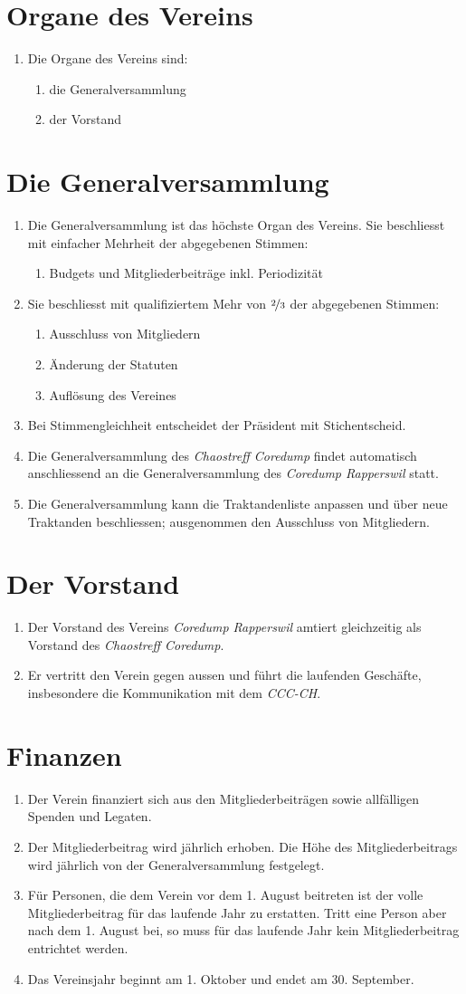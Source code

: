 \documentclass[10pt,a4paper,parskip,fleqn]{scrartcl}
\newcommand{\ol}{\begin{enumerate}[itemsep=-0.2em,topsep=-0.2em]}
\newcommand{\lo}{\end{enumerate}}
\newcommand{\li}{\item}
\newcommand{\name}{Chaostreff Coredump\xspace}
\newcommand{\iname}{\textit{\name}\xspace}
\newcommand{\parent}{Coredump Rapperswil\xspace}
\newcommand{\iparent}{\textit{\parent}\xspace}
\newcommand{\cccch}{CCC-CH\xspace}
\newcommand{\icccch}{\textit{\cccch}\xspace}
\begin{document}
\section{Organe des Vereins}

\ol
	\li Die Organe des Vereins sind:
		\ol
			\li die Generalversammlung
			\li der Vorstand
		\lo
\lo


\section{Die Generalversammlung}

\ol
	\li Die Generalversammlung ist das höchste Organ des Vereins. Sie beschliesst
	mit einfacher Mehrheit der abgegebenen Stimmen:
		\ol
			\li Budgets und Mitgliederbeiträge inkl. Periodizität
		\lo
	\li Sie beschliesst mit qualifiziertem Mehr von $\nicefrac{2}{3}$ der
	abgegebenen Stimmen:
		\ol
			\li Ausschluss von Mitgliedern
			\li Änderung der Statuten
			\li Auflösung des Vereines
		\lo
	\li Bei Stimmengleichheit entscheidet der Präsident mit Stichentscheid.
	\li Die Generalversammlung des \iname findet automatisch anschliessend an die
	Generalversammlung des \iparent statt.
	\li Die Generalversammlung kann die Traktandenliste anpassen und über neue
	Traktanden beschliessen; ausgenommen den Ausschluss von Mitgliedern.
\lo


\section{Der Vorstand}

\ol
	\li Der Vorstand des Vereins \iparent amtiert gleichzeitig als Vorstand des
	\iname.
	\li Er vertritt den Verein gegen aussen und führt die laufenden Geschäfte,
	insbesondere die Kommunikation mit dem \icccch.
\lo


\section{Finanzen}

\ol
	\li Der Verein finanziert sich aus den Mitgliederbeiträgen sowie allfälligen
	Spenden und Legaten.
	\li Der Mitgliederbeitrag wird jährlich erhoben. Die Höhe des
	Mitgliederbeitrags wird jährlich von der Generalversammlung festgelegt.
	\li Für Personen, die dem Verein vor dem 1. August beitreten ist der volle
	Mitgliederbeitrag für das laufende Jahr zu erstatten. Tritt eine Person aber
	nach dem 1. August bei, so muss für das laufende Jahr kein Mitgliederbeitrag
	entrichtet werden.
	\li Das Vereinsjahr beginnt am 1. Oktober und endet am 30. September.
\lo
\end{document}
